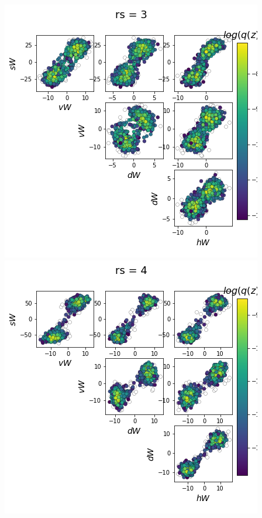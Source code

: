 \documentclass[11pt]{article}
\begin{document}
\begin{center}
\includegraphics[scale=0.33]{figs/Z_SC_reduced_c=0_p=50_rs=3.png} \\
\includegraphics[scale=0.33]{figs/Z_SC_reduced_c=0_p=50_rs=4.png}

\end{center}
\end{document}
